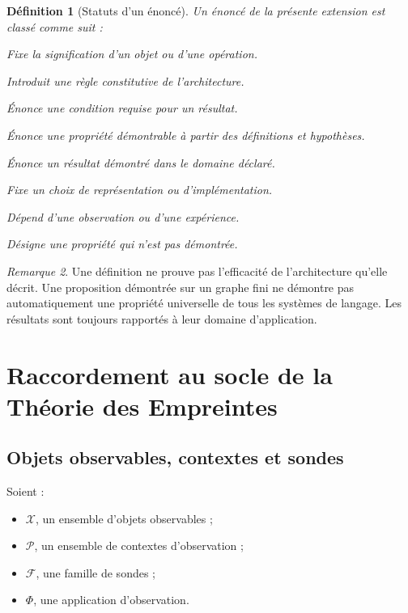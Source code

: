 \documentclass[11pt,a4paper,oneside]{book}
\newtheorem{definition}{Définition}[chapter]
\theoremstyle{remark}
\newtheorem{remarque}[definition]{Remarque}
\begin{document}
\begin{definition}[Statuts d'un énoncé]
Un énoncé de la présente extension est classé comme suit :
\begin{description}[leftmargin=3.2cm,style=nextline]
  \item[Définition] Fixe la signification d'un objet ou d'une opération.
  \item[Postulat] Introduit une règle constitutive de l'architecture.
  \item[Hypothèse] Énonce une condition requise pour un résultat.
  \item[Proposition] Énonce une propriété démontrable à partir des
        définitions et hypothèses.
  \item[Théorème] Énonce un résultat démontré dans le domaine déclaré.
  \item[Convention] Fixe un choix de représentation ou d'implémentation.
  \item[Résultat empirique] Dépend d'une observation ou d'une expérience.
  \item[Conjecture] Désigne une propriété qui n'est pas démontrée.
\end{description}
\end{definition}

\begin{remarque}
Une définition ne prouve pas l'efficacité de l'architecture qu'elle
décrit. Une proposition démontrée sur un graphe fini ne démontre pas
automatiquement une propriété universelle de tous les systèmes de
langage. Les résultats sont toujours rapportés à leur domaine
d'application.
\end{remarque}


\chapter{Raccordement au socle de la Théorie des Empreintes}

\section{Objets observables, contextes et sondes}

Soient :

\begin{itemize}
  \item \(\mathcal{X}\), un ensemble d'objets observables ;
  \item \(\mathcal{P}\), un ensemble de contextes d'observation ;
  \item \(\mathcal{F}\), une famille de sondes ;
  \item \(\Phi\), une application d'observation.
\end{itemize}
\end{document}
